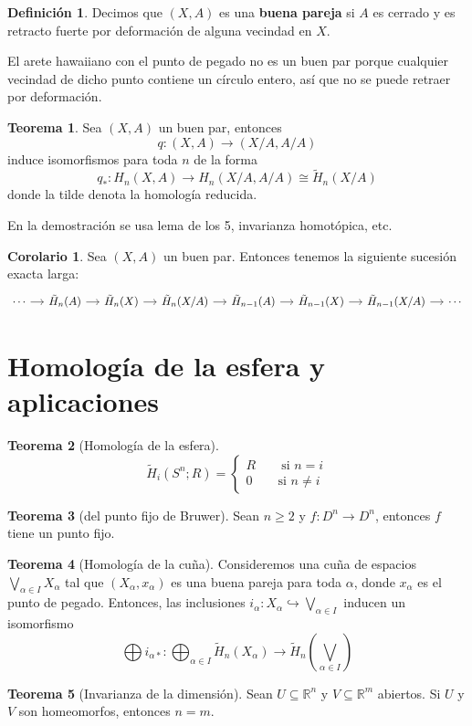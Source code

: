 \documentclass[spanish]{book}
\theoremstyle{definition}
\newtheorem*{defn}{Definición}
\newtheorem*{teo}{Teorema}
\newtheorem*{coro}{Corolario}
\newcommand{\R}{\mathbb{R}}
\begin{document}
	\begin{defn} Decimos que $(X,A)$ es una \textbf{buena pareja} si $A$ es cerrado y es retracto fuerte por deformación de alguna vecindad en $X$.
	\end{defn}
	
	El arete hawaiiano con el punto de pegado no es un buen par porque cualquier vecindad de dicho punto contiene un círculo entero, así que no se puede retraer por deformación.
	
	\begin{teo}Sea $(X,A)$ un buen par, entonces
		\[q:(X,A)\to(X/A,A/A)\]
		induce isomorfismos para toda $n$ de la forma
		\[q_{*}:H_n(X,A)\to H_n(X/A,A/A)\cong \tilde{H}_n(X/A)\]
		donde la tilde denota la homología reducida.
	\end{teo}
	
	En la demostración se usa lema de los 5, invarianza homotópica, etc.
	
	\begin{coro}
		Sea $(X,A)$ un buen par. Entonces tenemos la siguiente sucesión exacta larga:
		\[\begin{tikzcd}[column sep=small]
			\cdots \arrow[r] & \tilde{H}_n(A) \arrow[r] & \tilde{H}_n(X) \arrow[r] & \tilde{H}_n(X/A) \arrow[r] & \tilde{H}_{n-1}(A) \arrow[r] & \tilde{H}_{n-1}(X) \arrow[r] & \tilde{H}_{n-1}(X/A) \arrow[r] & \cdots
		\end{tikzcd}\]
	\end{coro}
	
\section{Homología de la esfera y aplicaciones}
	\begin{teo}[Homología de la esfera]
		\[\tilde H_i(S^n;R)=\begin{cases}R\qquad\text{si   } n=i\\
			0\qquad\text{si   } n\neq i
		\end{cases}\]
	\end{teo}
	\begin{teo}[del punto fijo de Bruwer]
		Sean $n\geq2$ y  $f:D^n\to D^n$, entonces $f$ tiene un punto fijo.
	\end{teo}
	\begin{teo}[Homología de la cuña]
		Consideremos una cuña de espacios $\bigvee_{\alpha\in I}X_\alpha$ tal que $(X_\alpha,x_\alpha)$ es una buena pareja para toda $\alpha$, donde $x_\alpha$ es el punto de pegado. Entonces, las inclusiones $i_\alpha:X_\alpha\hookrightarrow\bigvee_{\alpha\in I}$ inducen un isomorfismo
		\[\bigoplus i_{\alpha*}:\bigoplus_{\alpha\in I}\tilde{H}_n(X_\alpha)\to\tilde{H}_n\left(\bigvee_{\alpha\in I}\right)\]
	\end{teo}
	\begin{teo}[Invarianza de la dimensión]
		Sean $U\subseteq\R^n$ y $V\subseteq\R^m$ abiertos. Si $U$ y $V$ son homeomorfos, entonces $n=m$.
	\end{teo}
\end{document}
